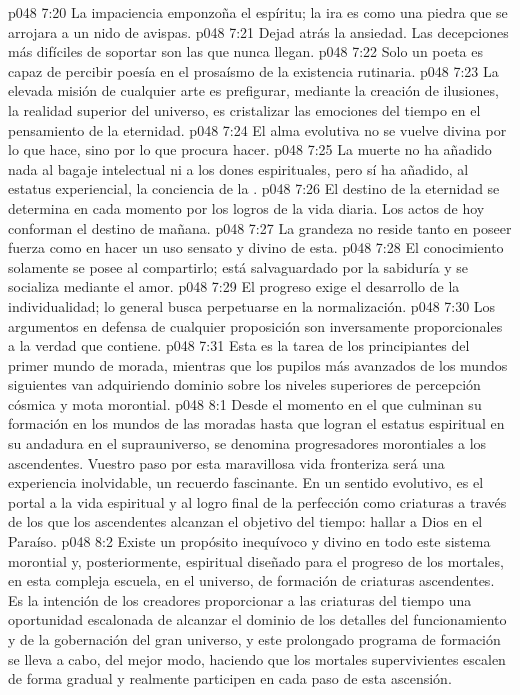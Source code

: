 \vs p048 7:20 La impaciencia emponzoña el espíritu; la ira es como una piedra que se arrojara a un nido de avispas.
\vs p048 7:21 Dejad atrás la ansiedad. Las decepciones más difíciles de soportar son las que nunca llegan.
\vs p048 7:22 Solo un poeta es capaz de percibir poesía en el prosaísmo de la existencia rutinaria.
\vs p048 7:23 La elevada misión de cualquier arte es prefigurar, mediante la creación de ilusiones, la realidad superior del universo, es cristalizar las emociones del tiempo en el pensamiento de la eternidad.
\vs p048 7:24 El alma evolutiva no se vuelve divina por lo que hace, sino por lo que procura hacer.
\vs p048 7:25 La muerte no ha añadido nada al bagaje intelectual ni a los dones espirituales, pero sí ha añadido, al estatus experiencial, la conciencia de la .
\vs p048 7:26 El destino de la eternidad se determina en cada momento por los logros de la vida diaria. Los actos de hoy conforman el destino de mañana.
\vs p048 7:27 La grandeza no reside tanto en poseer fuerza como en hacer un uso sensato y divino de esta.
\vs p048 7:28 El conocimiento solamente se posee al compartirlo; está salvaguardado por la sabiduría y se socializa mediante el amor.
\vs p048 7:29 El progreso exige el desarrollo de la individualidad; lo general busca perpetuarse en la normalización.
\vs p048 7:30 Los argumentos en defensa de cualquier proposición son inversamente proporcionales a la verdad que contiene.
\vs p048 7:31 \pc Esta es la tarea de los principiantes del primer mundo de morada, mientras que los pupilos más avanzados de los mundos siguientes van adquiriendo dominio sobre los niveles superiores de percepción cósmica y mota morontial.
\vs p048 8:1 Desde el momento en el que culminan su formación en los mundos de las moradas hasta que logran el estatus espiritual en su andadura en el suprauniverso, se denomina progresadores morontiales a los ascendentes. Vuestro paso por esta maravillosa vida fronteriza será una experiencia inolvidable, un recuerdo fascinante. En un sentido evolutivo, es el portal a la vida espiritual y al logro final de la perfección como criaturas a través de los que los ascendentes alcanzan el objetivo del tiempo: hallar a Dios en el Paraíso.
\vs p048 8:2 Existe un propósito inequívoco y divino en todo este sistema morontial y, posteriormente, espiritual diseñado para el progreso de los mortales, en esta compleja escuela, en el universo, de formación de criaturas ascendentes. Es la intención de los creadores proporcionar a las criaturas del tiempo una oportunidad escalonada de alcanzar el dominio de los detalles del funcionamiento y de la gobernación del gran universo, y este prolongado programa de formación se lleva a cabo, del mejor modo, haciendo que los mortales supervivientes escalen de forma gradual y realmente participen en cada paso de esta ascensión.
